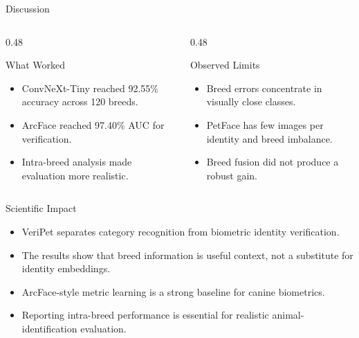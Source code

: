 \documentclass[aspectratio=169,11pt]{beamer}
\begin{document}
\begin{frame}{Discussion}
  \begin{columns}[T,onlytextwidth]
    \begin{column}{0.48\textwidth}
      \begin{block}{What Worked}
        \begin{itemize}
          \item ConvNeXt-Tiny reached 92.55\% accuracy across 120 breeds.
          \item ArcFace reached 97.40\% AUC for verification.
          \item Intra-breed analysis made evaluation more realistic.
        \end{itemize}
      \end{block}
    \end{column}
    \begin{column}{0.48\textwidth}
      \begin{block}{Observed Limits}
        \begin{itemize}
          \item Breed errors concentrate in visually close classes.
          \item PetFace has few images per identity and breed imbalance.
          \item Breed fusion did not produce a robust gain.
        \end{itemize}
      \end{block}
    \end{column}
  \end{columns}
\end{frame}

\begin{frame}{Scientific Impact}
  \begin{itemize}
    \item VeriPet separates category recognition from biometric identity verification.
    \item The results show that breed information is useful context, not a substitute for identity embeddings.
    \item ArcFace-style metric learning is a strong baseline for canine biometrics.
    \item Reporting intra-breed performance is essential for realistic animal-identification evaluation.
  \end{itemize}
\end{frame}
\end{document}
